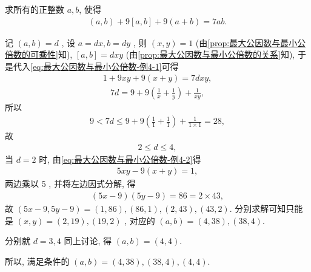 \begin{example}
	求所有的正整数 $a ,  b$, 使得
	\begin{align}\label{eq:最大公因数与最小公倍数-例4-1}
		(a, b)+9[a, b]+9(a+b)=7 a b.
	\end{align}
\end{example}
\begin{solution}
	记 $(a, b)=d$ , 设 $a=d x, b=d y$ , 则 $(x, y)=1$ (由\autoref{prop:最大公因数与最小公倍数的可乘性}知),  $[a, b]=d x y$ (由\autoref{prop:最大公因数与最小公倍数的关系}知), 于是代入\autoref{eq:最大公因数与最小公倍数-例4-1}可得
	\begin{align}\label{eq:最大公因数与最小公倍数-例4-2}
		1+9 x y+9(x+y)=7 d x y,
	\end{align}
	\begin{align*}
		7 d=9+9\left(\frac{1}{x}+\frac{1}{y}\right)+\frac{1}{x y},
	\end{align*}
	所以
	\begin{align*}
		9<7 d \leqslant 9+9\left(\frac{1}{1}+\frac{1}{1}\right)+\frac{1}{1 \times 1}=28,
	\end{align*}
	故
	\begin{align*}
		2 \leqslant d \leqslant 4,
	\end{align*}
	当 $d=2$ 时, 由\autoref{eq:最大公因数与最小公倍数-例4-2}得
	\begin{align*}
		5 x y-9(x+y)=1,
	\end{align*}
	两边乘以 5 , 并将左边因式分解, 得
	\begin{align*}
		(5 x-9)(5 y-9)=86=2 \times 43,
	\end{align*}
	故 $(5 x-9,5 y-9)=(1,86) , (86,1),(2,43) , (43,2)$. 分别求解可知只能是 $(x, y)=(2,19),(19,2)$ , 对应的 $(a, b)=(4,38),(38,4)$.

	分别就 $d=3,4$ 同上讨论, 得 $(a, b)=(4,4)$.

	所以, 满足条件的 $(a, b)=(4,38),(38,4),(4,4)$.
\end{solution}

